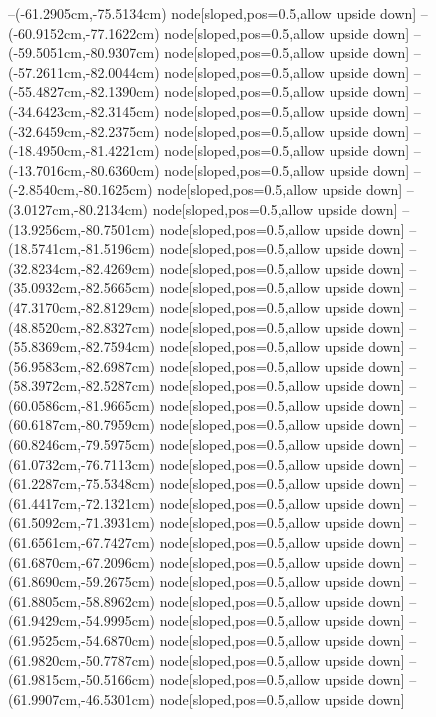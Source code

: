 --(-61.2905cm,-75.5134cm) node[sloped,pos=0.5,allow upside down]{\ArrowIn}
--(-60.9152cm,-77.1622cm) node[sloped,pos=0.5,allow upside down]{\ArrowIn}
--(-59.5051cm,-80.9307cm) node[sloped,pos=0.5,allow upside down]{\ArrowIn}
--(-57.2611cm,-82.0044cm) node[sloped,pos=0.5,allow upside down]{\ArrowIn}
--(-55.4827cm,-82.1390cm) node[sloped,pos=0.5,allow upside down]{\ArrowIn}
--(-34.6423cm,-82.3145cm) node[sloped,pos=0.5,allow upside down]{\ArrowIn}
--(-32.6459cm,-82.2375cm) node[sloped,pos=0.5,allow upside down]{\ArrowIn}
--(-18.4950cm,-81.4221cm) node[sloped,pos=0.5,allow upside down]{\ArrowIn}
--(-13.7016cm,-80.6360cm) node[sloped,pos=0.5,allow upside down]{\ArrowIn}
--(-2.8540cm,-80.1625cm) node[sloped,pos=0.5,allow upside down]{\ArrowIn}
--(3.0127cm,-80.2134cm) node[sloped,pos=0.5,allow upside down]{\ArrowIn}
--(13.9256cm,-80.7501cm) node[sloped,pos=0.5,allow upside down]{\ArrowIn}
--(18.5741cm,-81.5196cm) node[sloped,pos=0.5,allow upside down]{\ArrowIn}
--(32.8234cm,-82.4269cm) node[sloped,pos=0.5,allow upside down]{\ArrowIn}
--(35.0932cm,-82.5665cm) node[sloped,pos=0.5,allow upside down]{\ArrowIn}
--(47.3170cm,-82.8129cm) node[sloped,pos=0.5,allow upside down]{\ArrowIn}
--(48.8520cm,-82.8327cm) node[sloped,pos=0.5,allow upside down]{\ArrowIn}
--(55.8369cm,-82.7594cm) node[sloped,pos=0.5,allow upside down]{\ArrowIn}
--(56.9583cm,-82.6987cm) node[sloped,pos=0.5,allow upside down]{\ArrowIn}
--(58.3972cm,-82.5287cm) node[sloped,pos=0.5,allow upside down]{\ArrowIn}
--(60.0586cm,-81.9665cm) node[sloped,pos=0.5,allow upside down]{\ArrowIn}
--(60.6187cm,-80.7959cm) node[sloped,pos=0.5,allow upside down]{\ArrowIn}
--(60.8246cm,-79.5975cm) node[sloped,pos=0.5,allow upside down]{\ArrowIn}
--(61.0732cm,-76.7113cm) node[sloped,pos=0.5,allow upside down]{\ArrowIn}
--(61.2287cm,-75.5348cm) node[sloped,pos=0.5,allow upside down]{\ArrowIn}
--(61.4417cm,-72.1321cm) node[sloped,pos=0.5,allow upside down]{\ArrowIn}
--(61.5092cm,-71.3931cm) node[sloped,pos=0.5,allow upside down]{\arrowIn}
--(61.6561cm,-67.7427cm) node[sloped,pos=0.5,allow upside down]{\ArrowIn}
--(61.6870cm,-67.2096cm) node[sloped,pos=0.5,allow upside down]{\arrowIn}
--(61.8690cm,-59.2675cm) node[sloped,pos=0.5,allow upside down]{\ArrowIn}
--(61.8805cm,-58.8962cm) node[sloped,pos=0.5,allow upside down]{\arrowIn}
--(61.9429cm,-54.9995cm) node[sloped,pos=0.5,allow upside down]{\ArrowIn}
--(61.9525cm,-54.6870cm) node[sloped,pos=0.5,allow upside down]{\arrowIn}
--(61.9820cm,-50.7787cm) node[sloped,pos=0.5,allow upside down]{\ArrowIn}
--(61.9815cm,-50.5166cm) node[sloped,pos=0.5,allow upside down]{\arrowIn}
--(61.9907cm,-46.5301cm) node[sloped,pos=0.5,allow upside down]{\ArrowIn}
